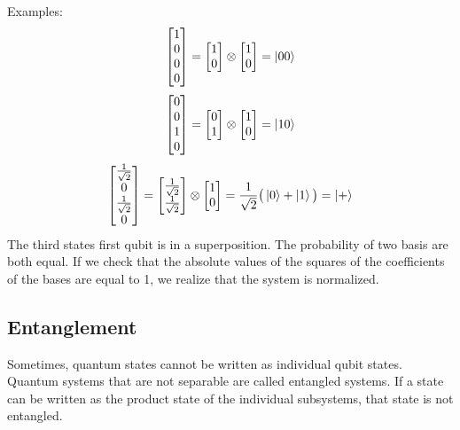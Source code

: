 \documentclass{article}
\begin{document}
Examples:
\begin{equation*}
    \begin{bmatrix} 1 \\ 0 \\ 0 \\ 0 \end{bmatrix} = \begin{bmatrix} 1 \\ 0 \end{bmatrix} \otimes \begin{bmatrix} 1 \\ 0 \end{bmatrix} = \ket{00}
\end{equation*}
\begin{equation*}
    \begin{bmatrix} 0 \\ 0 \\ 1 \\ 0 \end{bmatrix} = \begin{bmatrix} 0 \\ 1 \end{bmatrix} \otimes \begin{bmatrix} 1 \\ 0 \end{bmatrix} = \ket{10}
\end{equation*}
\begin{equation*}
    \begin{bmatrix} \frac{1}{\sqrt{2}} \\ 0 \\ \frac{1}{\sqrt{2}} \\ 0 \end{bmatrix} =
\begin{bmatrix} \frac{1}{\sqrt{2}} \\ \frac{1}{\sqrt{2}} \end{bmatrix} \otimes \begin{bmatrix} 1 \\ 0 \end{bmatrix} = \frac{1}{\sqrt{2}}\big(\ket{0} + \ket{1}\big) = \ket{+}
\end{equation*}
The third states first qubit is in a superposition. The probability of two basis are both equal. If we check that the absolute values of the squares of the coefficients of the bases are equal to 1, we realize that the system is normalized.
\subsection{Entanglement}
Sometimes, quantum states cannot be written as individual qubit states. Quantum systems that are not separable are called entangled systems. If a state can be written as the product state of the individual subsystems, that state is not entangled.
\end{document}
